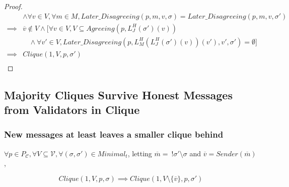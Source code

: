 \begin{proof}
\begin{align}
            &\land \forall v \in V, \forall m \in M, Later\_Disagreeing(p, m, v, \sigma) = Later\_Disagreeing(p, m, v, \sigma') \\
    \implies& \overline{v} \notin V \land [\forall v \in V, V \subseteq Agreeing(p, L^H_J(\sigma')(v)) \\
            &~~~~\land \forall v' \in V, Later\_Disagreeing(p, L^H_M(L^H_J(\sigma')(v))(v'), v', \sigma') = \emptyset] \\
    \implies& Clique(1, V, p, \sigma') \\
  \end{align}
\end{proof}



\subsection{Majority Cliques Survive Honest Messages from Validators in Clique}



\subsubsection{New messages at least leaves a smaller clique behind}

\begin{lemma}
$\forall p \in P_{\mathcal{C}}, \forall V \subseteq \mathcal{V}, \forall (\sigma, \sigma') \in Minimal_t$, letting $\overline{m} =~!\sigma'\setminus\sigma$ and $\overline{v} = Sender(\overline{m})$,

$$
Clique(1, V, p, \sigma) \implies Clique(1, V \setminus \{\overline{v}\}, p, \sigma')
$$
\end{lemma}


